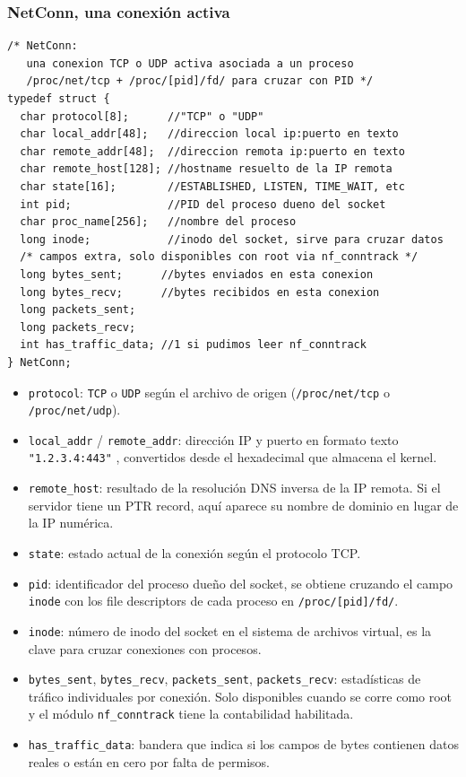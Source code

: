 \documentclass[12pt,letterpaper]{article}
\begin{document}
\subsubsection*{NetConn, una conexión activa}

\begin{lstlisting}[style=modernc, caption={\texttt{net\_monitor.h} struct NetConn}]
/* NetConn:
   una conexion TCP o UDP activa asociada a un proceso
   /proc/net/tcp + /proc/[pid]/fd/ para cruzar con PID */
typedef struct {
  char protocol[8];      //"TCP" o "UDP"
  char local_addr[48];   //direccion local ip:puerto en texto
  char remote_addr[48];  //direccion remota ip:puerto en texto
  char remote_host[128]; //hostname resuelto de la IP remota
  char state[16];        //ESTABLISHED, LISTEN, TIME_WAIT, etc
  int pid;               //PID del proceso dueno del socket
  char proc_name[256];   //nombre del proceso
  long inode;            //inodo del socket, sirve para cruzar datos
  /* campos extra, solo disponibles con root via nf_conntrack */
  long bytes_sent;      //bytes enviados en esta conexion
  long bytes_recv;      //bytes recibidos en esta conexion
  long packets_sent;
  long packets_recv;
  int has_traffic_data; //1 si pudimos leer nf_conntrack
} NetConn;
\end{lstlisting}

\begin{itemize}[leftmargin=1.5cm]
\item \texttt{protocol}: \texttt{TCP} o \texttt{UDP} según el archivo de origen (\texttt{/proc/net/tcp} o
  \texttt{/proc/net/udp}).
\item \texttt{local\_addr} / \texttt{remote\_addr}: dirección IP y puerto en formato texto \texttt{"1.2.3.4:443"}
  , convertidos desde el hexadecimal que almacena el kernel.
\item \texttt{remote\_host}: resultado de la resolución DNS inversa de la IP remota. Si el servidor tiene un PTR
  record, aquí aparece su nombre de dominio en lugar de la IP numérica.
\item \texttt{state}: estado actual de la conexión según el protocolo TCP.
\item \texttt{pid}: identificador del proceso dueño del socket, se obtiene cruzando el campo \texttt{inode} con
  los file descriptors de cada proceso en \texttt{/proc/[pid]/fd/}.
\item \texttt{inode}: número de inodo del socket en el sistema de archivos virtual, es la clave para cruzar
  conexiones con procesos.
\item \texttt{bytes\_sent}, \texttt{bytes\_recv}, \texttt{packets\_sent}, \texttt{packets\_recv}: estadísticas de
  tráfico individuales por conexión. Solo disponibles cuando se corre como root y el módulo
  \texttt{nf\_conntrack} tiene la contabilidad habilitada.
\item \texttt{has\_traffic\_data}: bandera que indica si los campos de bytes contienen datos reales o están en
  cero por falta de permisos.
\end{itemize}
\end{document}

